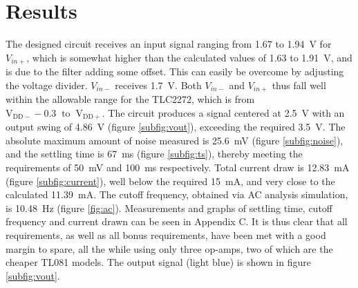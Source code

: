 \section{Results} \label{sec:temp_results}
The designed circuit receives an input signal ranging from 1.67 to \SI{1.94}{\volt} for $V_{in+}$, which is somewhat higher than the calculated values of 1.63 to \SI{1.91}{\volt}, and is due to the filter adding some offset. This can easily be overcome by adjusting the voltage divider. $V_{in-}$ receives \SI{1.7}{\volt}. Both $V_{in-}$ and $V_{in+}$ thus fall well within the allowable range for the TLC2272, which is from $\mathrm{V}_{\mathrm{DD}-}-0.3 \;\; \mathrm{to} \;\; \mathrm{V}_{\mathrm{DD}+}$\cite{tlc2272}.  The circuit produces a signal centered at \SI{2.5}{\volt} with an output swing of \SI{4.86}{\volt} (figure \ref{subfig:vout}), exceeding the required \SI{3.5}{\volt}. The absolute maximum amount of noise measured is \SI{25.6}{\milli\volt} (figure \ref{subfig:noise}), and the settling time is \SI{67}{ms} (figure \ref{subfig:ts}), thereby meeting the requirements of \SI{50}{\milli\volt} and \SI{100}{ms} respectively. Total current draw is \SI{12.83}{mA} (figure \ref{subfig:current}), well below the required \SI{15}{mA}, and very close to the calculated \SI{11.39}{mA}. The cutoff frequency, obtained via AC analysis simulation, is \SI{10.48}{Hz} (figure \ref{fig:ac}). Measurements and graphs of settling time, cutoff frequency and current drawn can be seen in Appendix C. It is thus clear that all requirements, as well as all bonus requirements, have been met with a good margin to spare, all the while using only three op-amps, two of which are the cheaper TL081 models. The output signal (light blue) is shown in figure \ref{subfig:vout}.

